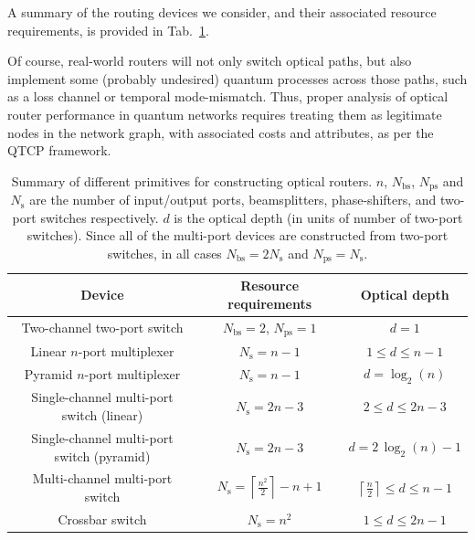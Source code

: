 A summary of the routing devices we consider, and their associated resource requirements, is provided in Tab.~\ref{tab:router_summary}.

Of course, real-world routers will not only switch optical paths, but also implement some (probably undesired) quantum processes across those paths, such as a loss channel or temporal mode-mismatch. Thus, proper analysis of optical router performance in quantum networks requires treating them as legitimate nodes in the network graph, with associated costs and attributes, as per the QTCP framework.

\startnormtable
\begin{table}[!htbp]
	\begin{tabular}{|c|c|c|}
		\hline
  		Device & Resource requirements & Optical depth \\
  		\hline
  		\hline
  		Two-channel two-port switch & \mbox{$N_\mathrm{bs}=2$}, \mbox{$N_\mathrm{ps}=1$} & \mbox{$d=1$} \\
  		Linear $n$-port multiplexer & \mbox{$N_\mathrm{s}=n-1$} & \mbox{$1\leq d\leq n-1$} \\
  		Pyramid $n$-port multiplexer & \mbox{$N_\mathrm{s}=n-1$} & \mbox{$d=\log_2(n)$} \\
    	Single-channel multi-port switch (linear) & \mbox{$N_\mathrm{s}=2n-3$} & \mbox{$2\leq d\leq 2n-3$} \\
  		Single-channel multi-port switch (pyramid) & \mbox{$N_\mathrm{s}=2n-3$} & \mbox{$d=2\,\log_2(n)-1$} \\
  		Multi-channel multi-port switch & \mbox{$N_\mathrm{s} = \left\lceil \frac{n^2}{2}\right\rceil - n + 1$} & \mbox{$\left\lceil \frac{n}{2} \right\rceil \leq d\leq n-1$} \\
  		Crossbar switch & \mbox{$N_\mathrm{s}=n^2$} & \mbox{$1\leq d\leq 2n-1$}\\
    	\hline
	\end{tabular}
	\captionspacetab \caption{Summary of different primitives for constructing optical routers. $n$, $N_\mathrm{bs}$, $N_\mathrm{ps}$ and $N_\mathrm{s}$ are the number of input/output ports, beamsplitters, phase-shifters, and two-port switches respectively. $d$ is the optical depth (in units of number of two-port switches). Since all of the multi-port devices are constructed from two-port switches, in all cases \mbox{$N_\mathrm{bs} = 2 N_\mathrm{s}$} and \mbox{$N_\mathrm{ps} = N_\mathrm{s}$}.} \label{tab:router_summary} 
\end{table}
\startalgtable

